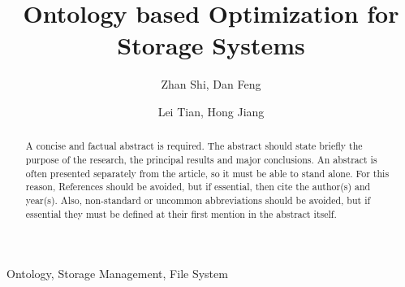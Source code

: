 \documentclass[preprint,12pt]{elsarticle}
\begin{document}
\begin{frontmatter}



\title{Ontology based Optimization for Storage Systems}


\author[HUST]{Zhan Shi, Dan Feng}

\address[HUST]{Wuhan National Laboratory for Optoelectronics,
Huazhong University of Science and Technology, Luoyu Rd. 1037, Wuhan, Hubei, China}

\author[UNL]{Lei Tian, Hong Jiang}

\address[UNL]{Department of Computer Science and Engineering, 
University of Nebraska - Lincoln, Lincoln, NE 68588 USA}

\begin{abstract}

A concise and factual abstract is required. The abstract should state briefly the purpose of the research, the principal results and major conclusions. An abstract is often presented separately from the article, so it must be able to stand alone. For this reason, References should be avoided, but if essential, then cite the author(s) and year(s). Also, non-standard or uncommon abbreviations should be avoided, but if essential they must be defined at their first mention in the abstract itself.

\end{abstract}

\begin{keyword}

Ontology, Storage Management, File System


\end{keyword}

\end{frontmatter}
\end{document}
